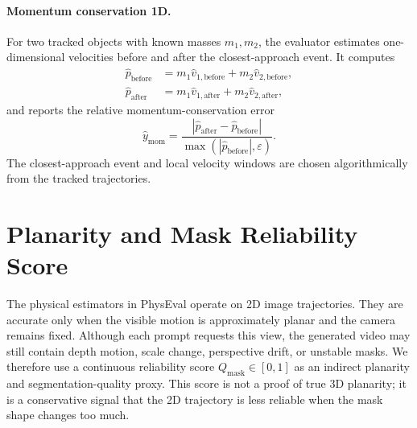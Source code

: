 \documentclass{article}
\newcommand{\bench}{PhysEval}
\newcommand{\eps}{\varepsilon}
\begin{document}
\paragraph{Momentum conservation 1D.}
For two tracked objects with known masses $m_1,m_2$, the evaluator estimates one-dimensional velocities before and after the closest-approach event.
It computes
\begin{align}
    \hat{p}_{\mathrm{before}} &= m_1\hat{v}_{1,\mathrm{before}} + m_2\hat{v}_{2,\mathrm{before}},\\
    \hat{p}_{\mathrm{after}} &= m_1\hat{v}_{1,\mathrm{after}} + m_2\hat{v}_{2,\mathrm{after}},
\end{align}
and reports the relative momentum-conservation error
\begin{equation}
    \hat{y}_{\mathrm{mom}} =
    \frac{|\hat{p}_{\mathrm{after}}-\hat{p}_{\mathrm{before}}|}
    {\max(|\hat{p}_{\mathrm{before}}|,\eps)}.
\end{equation}
The closest-approach event and local velocity windows are chosen algorithmically from the tracked trajectories.

\section{Planarity and Mask Reliability Score}
\label{app:mask-quality}

The physical estimators in \bench{} operate on 2D image trajectories.
They are accurate only when the visible motion is approximately planar and the camera remains fixed.
Although each prompt requests this view, the generated video may still contain depth motion, scale change, perspective drift, or unstable masks.
We therefore use a continuous reliability score $Q_{\mathrm{mask}}\in[0,1]$ as an indirect planarity and segmentation-quality proxy.
This score is not a proof of true 3D planarity; it is a conservative signal that the 2D trajectory is less reliable when the mask shape changes too much.
\end{document}
